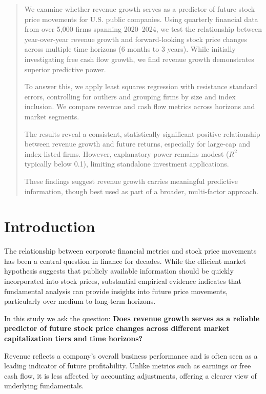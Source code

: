 \documentclass[11pt]{article}
\begin{document}
\begin{abstract}
We examine whether revenue growth serves as a predictor of future stock price movements for U.S. public companies. Using quarterly financial data from over 5,000 firms spanning 2020–2024, we test the relationship between year-over-year revenue growth and forward-looking stock price changes across multiple time horizons (6 months to 3 years). While initially investigating free cash flow growth, we find revenue growth demonstrates superior predictive power.

To answer this, we apply least squares regression with resistance standard errors, controlling for outliers and grouping firms by size and index inclusion. We compare revenue and cash flow metrics across horizons and market segments.

The results reveal a consistent, statistically significant positive relationship between revenue growth and future returns, especially for large-cap and index-listed firms. However, explanatory power remains modest ($R^2$ typically below 0.1), limiting standalone investment applications.

These findings suggest revenue growth carries meaningful predictive information, though best used as part of a broader, multi-factor approach.
\end{abstract}

\section{Introduction}

The relationship between corporate financial metrics and stock price movements has been a central question in finance for decades. While the efficient market hypothesis suggests that publicly available information should be quickly incorporated into stock prices, substantial empirical evidence indicates that fundamental analysis can provide insights into future price movements, particularly over medium to long-term horizons.

In this study we ask the question: \textbf{Does revenue growth serves as a reliable predictor of future stock price changes across different market capitalization tiers and time horizons?}

Revenue reflects a company's overall business performance and is often seen as a leading indicator of future profitability. Unlike metrics such as earnings or free cash flow, it is less affected by accounting adjustments, offering a clearer view of underlying fundamentals.
\end{document}
